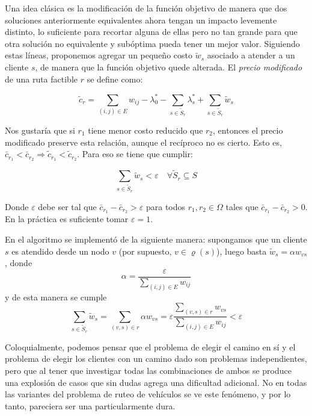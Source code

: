 Una idea clásica es la modificación de la función objetivo de manera que dos soluciones anteriormente equivalentes ahora tengan un impacto levemente distinto, lo suficiente para recortar alguna de ellas pero no tan grande para que otra solución no equivalente y subóptima pueda tener un mejor valor. Siguiendo estas líneas, proponemos agregar un pequeño costo $\tilde{w}_s$ asociado a atender a un cliente $s$, de manera que la función objetivo quede alterada. El \emph{precio modificado} de una ruta factible $r$ se define como:

\begin{equation}
    \tilde{c}_r = \sum_{(i, j) \in E}{w_{ij}} - \lambda^*_0 - \sum_{s \in \tilde{S}_r}{\lambda^*_s} + \sum_{s \in \tilde{S}_r}{\tilde{w}_s}
\end{equation}

Nos gustaría que si $r_1$ tiene menor costo reducido que $r_2$, entonces el precio modificado preserve esta relación, aunque el recíproco no es cierto. Esto es, $\bar{c}_{r_1} < \bar{c}_{r_2} \Rightarrow \tilde{c}_{r_1} < \tilde{c}_{r_2}$. Para eso se tiene que cumplir:

\begin{equation}
    \sum_{s \in \tilde{S}_r}{\tilde{w}_s} < \varepsilon \quad \forall \tilde{S}_r \subseteq S
\end{equation}

Donde $\varepsilon$ debe ser tal que $\bar{c}_{r_1} - \bar{c}_{r_2} > \varepsilon$ para todos $r_1, r_2 \in \Omega$ tales que $\bar{c}_{r_1} - \bar{c}_{r_2} > 0$. En la práctica es suficiente tomar $\varepsilon = 1$.

En el algoritmo se implementó de la siguiente manera: supongamos que un cliente $s$ es atendido desde un nodo $v$ (por supuesto, $v \in \varrho(s)$), luego basta $\tilde{w}_s = \alpha w_{vs}$, donde
\begin{equation}
    \alpha = \frac{\varepsilon}{\sum_{(i,j) \in E}{w_{ij}}}
\end{equation}
y de esta manera se cumple
\begin{equation}
    \sum_{s \in \tilde{S}_r}{\tilde{w}_s} = 
    \sum_{(v, s) \in r}{\alpha w_{vs}} = 
    \varepsilon \frac{\sum_{(v, s) \in r}{w_{vs}}}{\sum_{(i,j) \in E}{w_{ij}}} < 
    \varepsilon
\end{equation}

Coloquialmente, podemos pensar que el problema de elegir el camino en sí y el problema de elegir los clientes con un camino dado son problemas independientes, pero que al tener que investigar todas las combinaciones de ambos se produce una explosión de casos que sin dudas agrega una dificultad adicional. No en todas las variantes del problema de ruteo de vehículos se ve este fenómeno, y por lo tanto,  pareciera ser una particularmente dura. 

